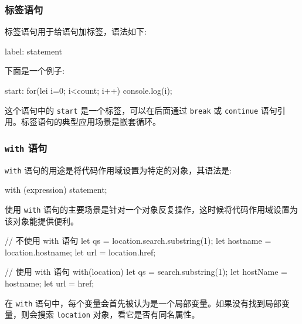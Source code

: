 \subsubsection{标签语句}

标签语句用于给语句加标签，语法如下:
\begin{JavaScript}
label: statement
\end{JavaScript}
下面是一个例子:
\begin{JavaScript}
start: for(lei i=0; i<count; i++) {
    console.log(i);
}
\end{JavaScript}

这个语句中的 \texttt{start} 是一个标签，可以在后面通过 \texttt{break} 或 \texttt{continue} 语句引用。标签语句的典型应用场景是嵌套循环。

\subsubsection{\texttt{with} 语句}

\texttt{with} 语句的用途是将代码作用域设置为特定的对象，其语法是:

\begin{JavaScript}
with (expression) statement;
\end{JavaScript}

使用 \texttt{with} 语句的主要场景是针对一个对象反复操作，这时候将代码作用域设置为该对象能提供便利。

\begin{JavaScript}
// 不使用 with 语句
let qs = location.search.substring(1);
let hostname = location.hostname;
let url = location.href;

// 使用 with 语句
with(location) {
    let qs = search.substring(1);
    let hostName = hostname;
    let url = href;
}
\end{JavaScript}

在 \texttt{with} 语句中，每个变量会首先被认为是一个局部变量。如果没有找到局部变量，则会搜索 \texttt{location} 对象，看它是否有同名属性。


\newpage